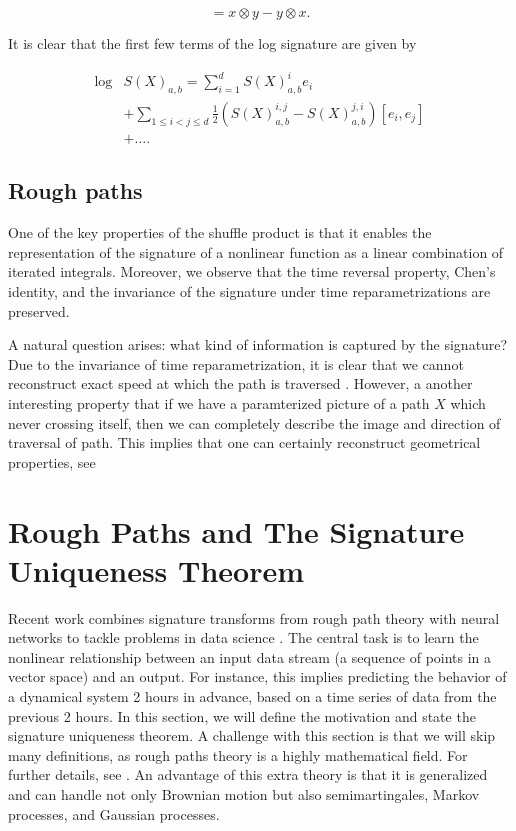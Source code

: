 \begin{equation}
[x, y] = x \otimes y - y \otimes x. \tag{1.55}
\end{equation}

It is clear that the first few terms of the log signature are given by

\begin{equation}
    \begin{split}
\log&  S(X)_{a,b}  = \sum_{i=1}^{d} S(X)^i_{a,b} e_i \\  &+ \sum_{1 \leq i < j \leq d} \frac{1}{2} \left( S(X)^{i,j}_{a,b}  - S(X)^{j,i}_{a,b} \right) [e_i, e_j] \\ &  + \dots .
    \end{split}
\end{equation}


\subsection{Rough paths}%
\label{sub:rough_paths}


One of the key properties of the shuffle product is that it enables the representation of the signature of a nonlinear function as a linear combination of iterated integrals. Moreover, we observe that the time reversal property, Chen's identity, and the invariance of the signature under time reparametrizations are preserved.

A natural question arises: what kind of information is captured by the signature?
Due to the invariance of time reparametrization, it is clear that we cannot reconstruct exact speed at which the path is traversed \cite{chevyrev2016primer}.
However, a another interesting property that if we have a paramterized picture of a path $X$ which never crossing itself, then we can completely describe the image and direction of traversal of path. This implies that one can certainly
reconstruct geometrical properties, see \cite{lyons2017hyperbolic, chang2019insertion, geng2017reconstruction}




\section{Rough Paths and The Signature Uniqueness Theorem}

Recent work combines signature transforms from rough path theory with neural networks to tackle problems in data science \cite{fermanian2023new, cass2024lecture}. The central task is to learn the nonlinear relationship between an input data stream (a sequence of points in a vector space)
and an output.
For instance, this implies predicting the behavior of a dynamical system 2 hours in advance, based on a time series of data from the previous 2 hours.
In this section, we will define the motivation and state the signature uniqueness theorem. A challenge with this section is that we will skip many definitions, as rough paths theory is a highly mathematical field. For further details, see \cite{boedihardjo2016signature}.
An advantage of this extra theory is that it is generalized and can handle not only Brownian motion but also semimartingales, Markov processes, and Gaussian processes.

